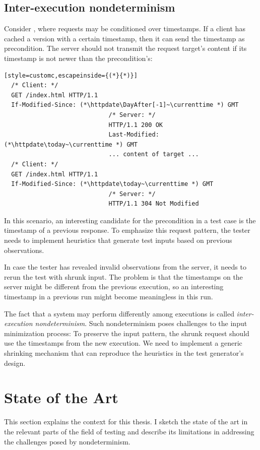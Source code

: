 \subsection{Inter-execution nondeterminism}
\label{sec:inter-execution}
Consider \http, where requests may be conditioned over timestamps.  If a client
has cached a version with a certain timestamp, then it can send the timestamp as
 precondition.  The server should not transmit the
request target's content if its  timestamp is not newer
than the precondition's:
\begin{lstlisting}[style=customc,escapeinside={(*}{*)}]
  /* Client: */
  GET /index.html HTTP/1.1
  If-Modified-Since: (*\httpdate\DayAfter[-1]~\currenttime *) GMT
                             /* Server: */
                             HTTP/1.1 200 OK
                             Last-Modified: (*\httpdate\today~\currenttime *) GMT
                             ... content of target ...
  /* Client: */
  GET /index.html HTTP/1.1
  If-Modified-Since: (*\httpdate\today~\currenttime *) GMT
                             /* Server: */
                             HTTP/1.1 304 Not Modified
\end{lstlisting}
In this scenario, an interesting candidate for the 
precondition in a test case is the  timestamp of a
previous response.  To emphasize this request pattern, the tester needs to
implement heuristics that generate test inputs based on previous observations.

In case the tester has revealed invalid observations from the server, it needs
to rerun the test with shrunk input.  The problem is that the timestamps on the
server might be different from the previous execution, so an interesting
timestamp in a previous run might become meaningless in this run.

The fact that a system may perform differently among executions is called {\em
inter-execution nondeterminism}.  Such nondeterminism poses challenges to the
input minimization process: To preserve the input pattern, the shrunk \http
request should use the timestamps from the new execution.  We need to implement
a generic shrinking mechanism that can reproduce the heuristics in the test
generator's design.

\section{State of the Art}
\label{sec:existing-work}
This section explains the context for this thesis.  I sketch the state of the
art in the relevant parts of the field of testing and describe its limitations
in addressing the challenges posed by nondeterminism.

